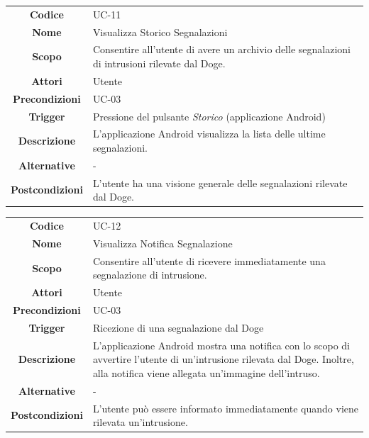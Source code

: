 \documentclass{article}
\begin{document}
    \begin{adjustbox}{center}
    \begin{tabular}{|c|p{10cm}|}
    \hline
    \textbf{Codice} & UC-11 \\
    \textbf{Nome} & Visualizza Storico Segnalazioni \\
    \textbf{Scopo} & Consentire all'utente di avere un archivio delle segnalazioni di intrusioni rilevate dal Doge. \\
    \textbf{Attori} & Utente \\
    \textbf{Precondizioni} & UC-03 \\
    \textbf{Trigger} & Pressione del pulsante \emph{Storico} (applicazione Android) \\
    \textbf{Descrizione} & L'applicazione Android visualizza la lista delle ultime segnalazioni. \\
    \textbf{Alternative} & - \\
    \textbf{Postcondizioni} & L'utente ha una visione generale delle segnalazioni rilevate dal Doge. \\
    \hline
    \end{tabular}
    \end{adjustbox}
    
    \begin{adjustbox}{center}
    \begin{tabular}{|c|p{10cm}|}
    \hline
    \textbf{Codice} & UC-12 \\
    \textbf{Nome} & Visualizza Notifica Segnalazione \\
    \textbf{Scopo} & Consentire all'utente di ricevere immediatamente una segnalazione di intrusione. \\
    \textbf{Attori} & Utente \\
    \textbf{Precondizioni} & UC-03 \\
    \textbf{Trigger} & Ricezione di una segnalazione dal Doge \\
    \textbf{Descrizione} & L'applicazione Android mostra una notifica con lo scopo di avvertire l'utente di un'intrusione rilevata dal Doge. Inoltre, alla notifica
    viene allegata un'immagine dell'intruso. \\
    \textbf{Alternative} & - \\
    \textbf{Postcondizioni} & L'utente può essere informato immediatamente quando viene rilevata un'intrusione. \\
    \hline
    \end{tabular}
    \end{adjustbox}
    
\end{document}
